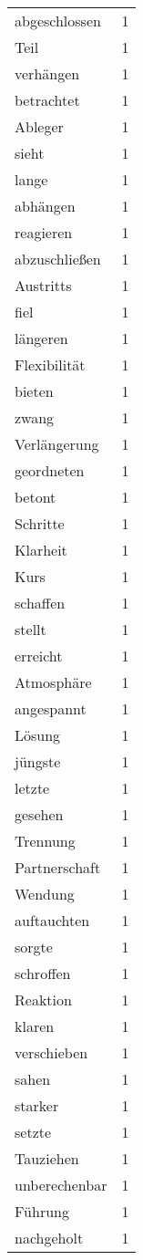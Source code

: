 \begin{tabular}{lr}
abgeschlossen & 1 \\
Teil & 1 \\
verhängen & 1 \\
betrachtet & 1 \\
Ableger & 1 \\
sieht & 1 \\
lange & 1 \\
abhängen & 1 \\
reagieren & 1 \\
abzuschließen & 1 \\
Austritts & 1 \\
fiel & 1 \\
längeren & 1 \\
Flexibilität & 1 \\
bieten & 1 \\
zwang & 1 \\
Verlängerung & 1 \\
geordneten & 1 \\
betont & 1 \\
Schritte & 1 \\
Klarheit & 1 \\
Kurs & 1 \\
schaffen & 1 \\
stellt & 1 \\
erreicht & 1 \\
Atmosphäre & 1 \\
angespannt & 1 \\
Lösung & 1 \\
jüngste & 1 \\
letzte & 1 \\
gesehen & 1 \\
Trennung & 1 \\
Partnerschaft & 1 \\
Wendung & 1 \\
auftauchten & 1 \\
sorgte & 1 \\
schroffen & 1 \\
Reaktion & 1 \\
klaren & 1 \\
verschieben & 1 \\
sahen & 1 \\
starker & 1 \\
setzte & 1 \\
Tauziehen & 1 \\
unberechenbar & 1 \\
Führung & 1 \\
nachgeholt & 1 \\

\end{tabular}
